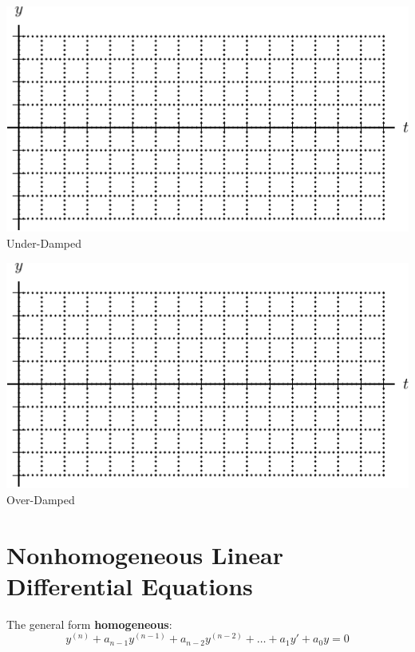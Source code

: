   \begin{minipage}[h]{0.475\linewidth}
    \begin{center}
      
   \vspace{0pt} 
   \includegraphics[width=0.9\linewidth]{graphics/notes_08_spring_mass_axes}\\
Under-Damped  

\hrulefill

   \includegraphics[width=0.9\linewidth]{graphics/notes_08_spring_mass_axes}\\
Over-Damped
    \end{center}
  \end{minipage}

\newpage
{}
\section*{Nonhomogeneous Linear Differential Equations}

The general form 
{\bf homogeneous}: \\[2ex]
$$ y^{(n)} + a_{n-1} y^{(n-1)} + a_{n-2} y^{(n-2)} + \ldots + a_1 y' + a_0 y = 0$$ \\[2ex]


